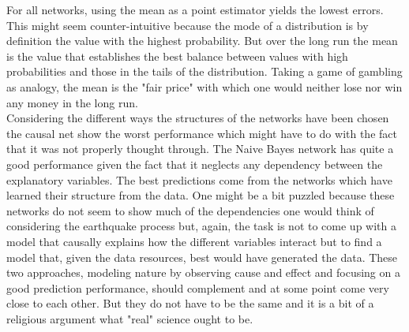 For all networks, using the mean as a point estimator yields the lowest errors. This might seem counter-intuitive because the mode of a distribution is by definition the value with the highest probability. But over the long run the mean is the value that establishes the best balance between values with high probabilities and those in the tails of the distribution. Taking a game of gambling as analogy, the mean is the "fair price" with which one would neither lose nor win any money in the long run.\\
Considering the different ways the structures of the networks have been chosen the causal net show the worst performance which might have to do with the fact that it was not properly thought through. The Naive Bayes network has quite a good performance given the fact that it neglects any dependency between the explanatory variables. The best predictions come from the networks which have learned their structure from the data. One might be a bit puzzled because these networks do not seem to show much of the dependencies one would think of considering the earthquake process but, again, the task is not to come up with a model that causally explains how the different variables interact but to find a model that, given the data resources, best would have generated the data. These two approaches, modeling nature by observing cause and effect and focusing on a good prediction performance, should complement and at some point come very close to each other. But they do not have to be the same  and it is a bit of a religious argument what "real" science ought to be.

